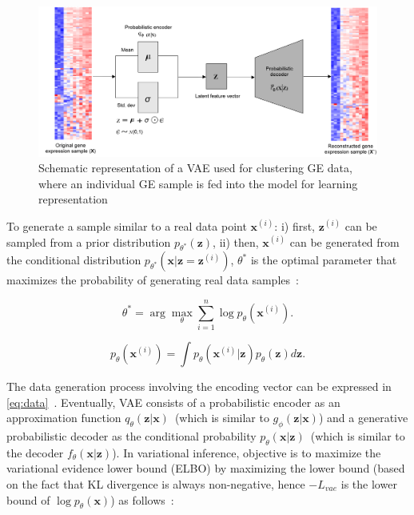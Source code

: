 \begin{figure}[h]
	\centering
	\includegraphics[scale=0.5]{images/vae.png}	
	\caption{Schematic representation of a VAE used for clustering GE data, where an individual GE sample is fed into the model for learning representation~\cite{karimBIB2019}}	
	\label{fig:vae}
	\vspace{-4mm} 
\end{figure}

\hspace*{3.5mm} To generate a sample similar to a real data point $\mathbf{x}^{(i)}$: i) first, $\mathbf{z}^{(i)}$ can be sampled from a prior distribution $p_{\theta^{*}}(\mathbf{z})$, ii) then,  $\mathbf{x}^{(i)}$ can be generated from the conditional distribution $p_{\theta^{*}}\left(\mathbf{x} | \mathbf{z}=\mathbf{z}^{(i)}\right)$, $\theta^{*}$ is the optimal parameter that maximizes the probability of generating real data samples~\cite{VADE}:

\begin{equation}
    \theta^{*}=\arg \max _{\theta} \sum_{i=1}^{n} \log p_{\theta}\left(\mathbf{x}^{(i)}\right).
\end{equation}

\begin{equation}
    p_{\theta}\left(\mathbf{x}^{(i)}\right)=\int p_{\theta}\left(\mathbf{x}^{(i)} | \mathbf{z}\right) p_{\theta}(\mathbf{z}) d \mathbf{z}.
    \label{eq:data}
\end{equation}

\hspace*{3.5mm} The data generation process involving the encoding vector can be expressed in \cref{eq:data}~\cite{VADE}. Eventually, VAE consists of a probabilistic encoder as an approximation function $q_{\theta}(\mathbf{z} | \mathbf{x})$~(which is similar to $g_{\phi}(\mathbf{z} | \mathbf{x})$) and a generative probabilistic decoder as the conditional probability $p_{\theta}(\mathbf{x}|\mathbf{z})$~(which is similar to the decoder $f_{\theta}(\mathbf{x}|\mathbf{z})$). In variational inference, objective is to maximize the variational evidence lower bound (ELBO) by maximizing the lower bound (based on the fact that KL divergence is always non-negative, hence $-L_{vae}$ is the lower bound of $\log p_{\theta}(\mathbf{x})$) as follows~\cite{VADE}: 

